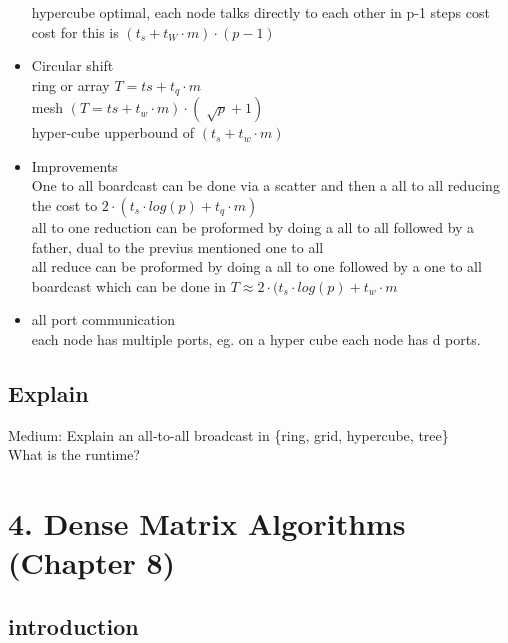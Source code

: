 \documentclass[a4paper,10pt,titlepage]{report}
\begin{document}
\begin{itemize}
\hspace{5mm}        hypercube optimal, each node talks directly to each other in p-1 steps cost cost for this is $(t_s+t_W\cdot m) \cdot (p-1)$
\item Circular shift \\
\hspace{5mm}	ring or array $T= ts+t_q \cdot m$ \\
\hspace{5mm}    mesh $(T= ts+t_w \cdot m) \cdot (\sqrt[]{p}+1)$ \\
\hspace{5mm}    hyper-cube upperbound of $(t_s+t_w \cdot m)$
\item Improvements \\
\hspace{5mm}	One to all boardcast can be done via a scatter and then a all to all reducing the cost to $2 \cdot (t_s \cdot log (p) + t_q \cdot m)$ \\
\hspace{5mm}    all to one reduction can be proformed by doing a all to all followed by a father, dual to the previus mentioned one to all \\
\hspace{5mm}    all reduce can be proformed by doing a all to one followed by a one to all boardcast which can be done in $T \approx 2 \cdot (t_s \cdot log(p) + t_w \cdot m $
\item all port communication \\
\hspace{5mm}		each node has multiple ports, eg. on a hyper cube each node has d ports.
\end{itemize}

\subsection{Explain} 
Medium: Explain an all-to-all broadcast in  \{ring, grid, hypercube, tree\} \\
\hspace{5mm}      What is the runtime?\textbf{}      

\newpage
\section{
4. Dense Matrix Algorithms (Chapter 8) }
\subsection{introduction}
   
\end{document}
